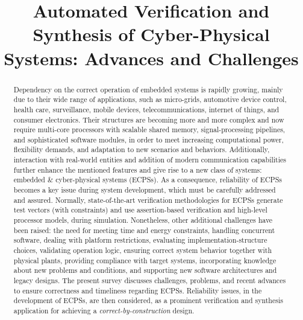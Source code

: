 \documentclass{cta-author}
\begin{document}

\title{Automated Verification and Synthesis of Cyber-Physical Systems: Advances and Challenges}

\author{  }

\address{
}

\begin{abstract}
 Dependency on the correct operation of embedded systems is rapidly growing, mainly due to their wide range of applications, such as micro-grids, automotive device control, health care, surveillance, mobile devices, telecommunications, internet of things, and consumer electronics. Their structures are becoming more and more complex and now require multi-core processors with scalable shared memory, signal-processing pipelines, and sophisticated software modules, in order to meet increasing computational power, flexibility demands, and adaptation to new scenarios and behaviors. Additionally, interaction with real-world entities and addition of modern communication capabilities further enhance the mentioned features and give rise to a new class of systems: embedded \& cyber-physical systems (ECPSs). As a consequence, reliability of ECPSs becomes a key issue during system development, which must be carefully addressed and assured. Normally, state-of-the-art verification methodologies for ECPSs generate test vectors (with constraints) and use assertion-based verification and high-level processor models, during simulation. Nonetheless, other additional challenges have been raised: the need for meeting time and energy constraints, handling concurrent software, dealing with platform restrictions, evaluating implementation-structure choices, validating operation logic, ensuring correct system behavior together with physical plants, providing compliance with target systems, incorporating knowledge about new problems and conditions, and supporting new software architectures and legacy designs. The present survey discusses challenges, problems, and recent advances to ensure correctness and timeliness regarding ECPSs. Reliability issues, in the development of ECPSs, are then considered, as a prominent verification and synthesis application for achieving a \textit{correct-by-construction} design.
\end{abstract}
\end{document}
